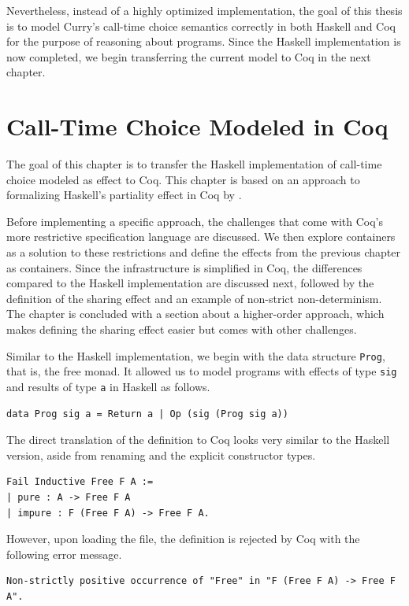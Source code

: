 \documentclass[a4paper, 11pt, fleqn, twoside, abstract=on]{scrreprt}
\newcommand{\hinl}[1]{\texttt{#1}}
\begin{document}
Nevertheless, instead of a highly optimized implementation, the goal of this thesis is to model Curry's call-time choice semantics correctly in both Haskell and Coq for the purpose of reasoning about programs.
Since the Haskell implementation is now completed, we begin transferring the current model to Coq in the next chapter.

\chapter{Call-Time Choice Modeled in Coq}
\label{ch:callTimeChoiceCoq}

The goal of this chapter is to transfer the Haskell implementation of call-time choice modeled as effect to Coq.
This chapter is based on an approach to formalizing Haskell's partiality effect in Coq by \citet{dylus2019oneMonad}.

Before implementing a specific approach, the challenges that come with Coq's more restrictive specification language are discussed.
We then explore containers as a solution to these restrictions and define the effects from the previous chapter as containers.
Since the infrastructure is simplified in Coq, the differences compared to the Haskell implementation are discussed next, followed by the definition of the sharing effect and an example of non-strict non-determinism.
The chapter is concluded with a section about a higher-order approach, which makes defining the sharing effect easier but comes with other challenges.

Similar to the Haskell implementation, we begin with the data structure \hinl{Prog}, that is, the free monad.
It allowed us to model programs with effects of type \hinl{sig} and results of type \hinl{a} in Haskell as follows.

\begin{verbatim}
data Prog sig a = Return a | Op (sig (Prog sig a))
\end{verbatim}
\noindent
The direct translation of the definition to Coq looks very similar to the Haskell version, aside from renaming and the explicit constructor types.

\begin{verbatim}
Fail Inductive Free F A :=
| pure : A -> Free F A
| impure : F (Free F A) -> Free F A.
\end{verbatim}
\noindent
However, upon loading the file, the definition is rejected by Coq with the following error message.

\begin{verbatim}
Non-strictly positive occurrence of "Free" in "F (Free F A) -> Free F A".
\end{verbatim}
\end{document}
